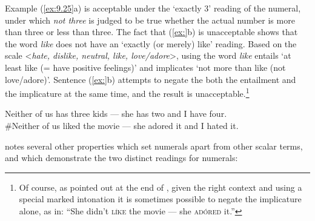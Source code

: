 Example (\ref{ex:9.25}a) is acceptable under the ‘exactly 3’ reading of the numeral, under which \textit{not three} is judged to be true whether the actual number is more than three or less than three. The fact that (\ref{ex:}b) is unacceptable shows that the word \textit{like} does not have an ‘exactly (or merely) like’ reading. Based on the scale <\textit{hate, dislike, neutral, like, love/adore}>, using the word \textit{like} entails ‘at least like (= have positive feelings)’ and implicates ‘not more than like (not love/adore)’. Sentence (\ref{ex:}b) attempts to negate the both the entailment and the implicature at the same time, and the result is unacceptable.\footnote{Of course, as pointed out at the end of , given the right context and using a special marked intonation it is sometimes possible to negate the implicature alone, as in: “She didn’t \textsc{líke} the movie — she \textsc{adóred} it.”}


\ea \label{ex:9.25}
\ea Neither of us has three kids — she has two and I have four.\\
\ex \#Neither of us liked the movie — she adored it and I hated it.
                       \z
\z


\citet{Horn1992} notes several other properties which set numerals apart from other scalar terms, and which demonstrate the two distinct readings for numerals:



